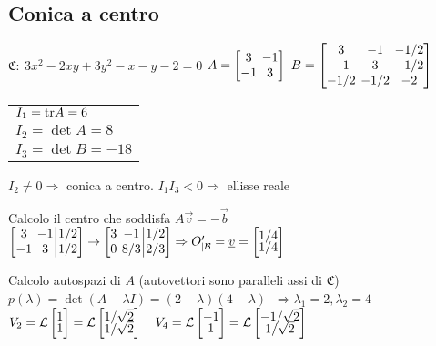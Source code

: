 \subsection{Conica a centro}
$\mathfrak{C}:\ 3x^2-2xy+3y^2-x-y-2=0$
$
A = \left[
	\arraycolsep=2.0pt\def\arraystretch{1.0}
	\begin{array}{@{}cc@{}}
		3  & -1 \\
		-1 & 3
	\end{array}
\right]
\
B = \left[
	\arraycolsep=2.0pt\def\arraystretch{1.0}
	\begin{array}{@{}ccc@{}}
		3  & -1 & -1/2 \\
		-1 & 3  & -1/2 \\
		-1/2  & -1/2 & -2 \\
	\end{array}
\right]
$
\begin{tabular}{l}
	$I_1 = \mathrm{tr} A = 6$ \\
	$I_2 = \det A = 8$ \\ 
	$I_3 = \det B = -18$
\end{tabular}

$I_2 \neq 0 \Rightarrow$ conica a centro. $I_1 I_3 < 0 \Rightarrow$ ellisse reale

Calcolo il centro che soddisfa $A \vec{v} = -\vec{b}$
$
\left[
	\arraycolsep=2.0pt\def\arraystretch{1.0}
	\begin{array}{@{}cc|c@{}}
		3  & -1 & 1/2 \\
		-1 & 3  & 1/2
	\end{array}
\right]
\rightarrow
\left[
	\arraycolsep=2.0pt\def\arraystretch{1.0}
	\begin{array}{@{}cc|c@{}}
		3  & -1   & 1/2 \\
		0  & 8/3  & 2/3 
	\end{array}
\right]
\Rightarrow
O'_{|\Base} = \vec{v} =
\begin{bmatrix}
	1/4 \\[-0.3em]
	1/4 \\
\end{bmatrix}
$

Calcolo autospazi di $A$ (autovettori sono paralleli assi di $\mathfrak{C}$)
$p(\lambda) = \det(A-\lambda I) = (2-\lambda)(4-\lambda)$
$\ \Rightarrow \lambda_1 = 2, \lambda_2 = 4$
$V_2 = \mathcal{L} 
\begin{bmatrix}
	1 \\[-0.3em]
	1 \\
\end{bmatrix}
= \mathcal{L}
\begin{bmatrix}
	1/\sqrt{2} \\[-0.3em]
	1/\sqrt{2} \\
\end{bmatrix}
\quad
V_4 = \mathcal{L} 
\begin{bmatrix}
	-1 \\[-0.3em]
	1 \\
\end{bmatrix}
= \mathcal{L}
\begin{bmatrix}
	-1/\sqrt{2} \\[-0.3em]
	1/\sqrt{2} \\
\end{bmatrix}
$

